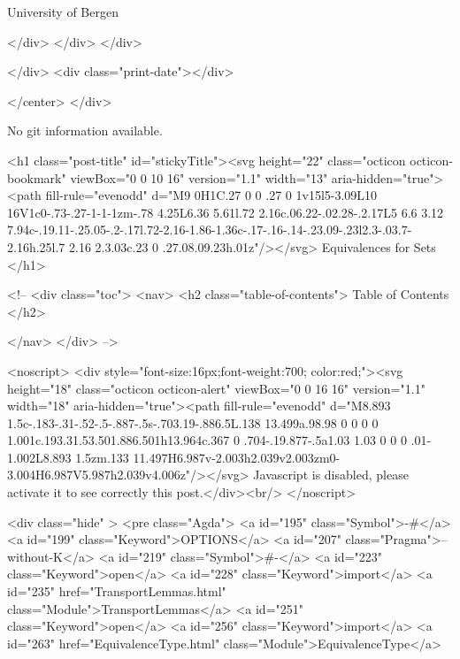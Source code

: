                   University of Bergen
                
                </div>
            </div>
          </div>
          
          
        </div>
        <div class="print-date"></div>
        
        
    </center>
  </div>

  
  No git information available.
  
  <h1 class="post-title" id="stickyTitle"><svg height="22" class="octicon octicon-bookmark" viewBox="0 0 10 16" version="1.1" width="13" aria-hidden="true"><path fill-rule="evenodd" d="M9 0H1C.27 0 0 .27 0 1v15l5-3.09L10 16V1c0-.73-.27-1-1-1zm-.78 4.25L6.36 5.61l.72 2.16c.06.22-.02.28-.2.17L5 6.6 3.12 7.94c-.19.11-.25.05-.2-.17l.72-2.16-1.86-1.36c-.17-.16-.14-.23.09-.23l2.3-.03.7-2.16h.25l.7 2.16 2.3.03c.23 0 .27.08.09.23h.01z"/></svg> Equivalences for Sets
  </h1>

  <!-- 
  <div class="toc">
    <nav>
    <h2 class="table-of-contents"> Table of Contents </h2>
      

    </nav>
  </div>
   -->

  <noscript>
  <div style="font-size:16px;font-weight:700; color:red;"><svg height="18" class="octicon octicon-alert" viewBox="0 0 16 16" version="1.1" width="18" aria-hidden="true"><path fill-rule="evenodd" d="M8.893 1.5c-.183-.31-.52-.5-.887-.5s-.703.19-.886.5L.138 13.499a.98.98 0 0 0 0 1.001c.193.31.53.501.886.501h13.964c.367 0 .704-.19.877-.5a1.03 1.03 0 0 0 .01-1.002L8.893 1.5zm.133 11.497H6.987v-2.003h2.039v2.003zm0-3.004H6.987V5.987h2.039v4.006z"/></svg> Javascript is disabled, please activate it to see correctly this post.</div><br/>
  </noscript>

  <div class="hide" >
<pre class="Agda">
<a id="195" class="Symbol">{-#</a> <a id="199" class="Keyword">OPTIONS</a> <a id="207" class="Pragma">--without-K</a> <a id="219" class="Symbol">#-}</a>
<a id="223" class="Keyword">open</a> <a id="228" class="Keyword">import</a> <a id="235" href="TransportLemmas.html" class="Module">TransportLemmas</a>
<a id="251" class="Keyword">open</a> <a id="256" class="Keyword">import</a> <a id="263" href="EquivalenceType.html" class="Module">EquivalenceType</a>

